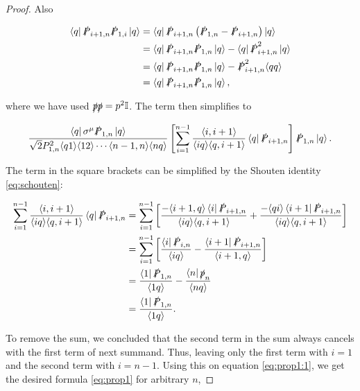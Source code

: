 \documentclass{article}
\theoremstyle{definition}
\numberwithin{equation}{section}
\begin{document}
\begin{proof}
    Also

    \begin{align*}
        \bra{q} \slashed{P}_{i+1,n} \slashed{P}_{1,i} \ket{q} &= \bra{q} \slashed{P}_{i+1,n} \left( \slashed{P}_{1,n} - \slashed{P}_{i+1,n} \right) \ket{q} \\
        &= \bra{q} \slashed{P}_{i+1,n} \slashed{P}_{1,n} \ket{q} - \bra{q} \slashed{P}_{i+1,n}^2 \ket{q} \\
        &= \bra{q} \slashed{P}_{i+1,n} \slashed{P}_{1,n} \ket{q} - \slashed{P}_{i+1,n}^2 \langle qq \rangle \\
        &= \bra{q} \slashed{P}_{i+1,n} \slashed{P}_{1,n} \ket{q},
    \end{align*}

    where we have used $\slashed{p}\slashed{p} = p^2\mathbb{I}$. The term then simplifies to

    \begin{align}
        \frac{ \bra{q} \sigma^{\mu} \slashed{P}_{1,n} \ket{q} }{ \sqrt{2} P_{1,n}^2 \langle q1 \rangle \langle 12 \rangle \cdots \langle n-1,n \rangle \langle nq \rangle } \left[ \sum_{i=1}^{n-1} \frac{ \langle i,i+1 \rangle }{\langle iq \rangle \langle q,i+1 \rangle} \bra{q} \slashed{P}_{i+1,n} \right] \slashed{P}_{1,n} \ket{q}. \label{eq:prop1:1}
    \end{align}

    The term in the square brackets can be simplified by the Shouten identity \eqref{eq:schouten}:

    \begin{align}
        \sum_{i=1}^{n-1} \frac{ \langle i,i+1 \rangle }{\langle iq \rangle \langle q,i+1 \rangle} \bra{q} \slashed{P}_{i+1,n} &= \sum_{i=1}^{n-1} \left[ \frac{- \langle i+1,q \rangle \bra{i} \slashed{P}_{i+1,n} }{\langle iq \rangle \langle q,i+1 \rangle} + \frac{- \langle qi \rangle \bra{i+1} \slashed{P}_{i+1,n}}{\langle iq \rangle \langle q,i+1 \rangle} \right] \\
        &= \sum_{i=1}^{n-1} \left[ \frac{\bra{i} \slashed{P}_{i,n} }{\langle iq \rangle} - \frac{\bra{i+1} \slashed{P}_{i+1,n}}{\langle i+1,q \rangle} \right] \\
        &= \frac{\bra{1} \slashed{P}_{1,n} }{\langle 1q \rangle} - \frac{\bra{n} \slashed{p}_{n} }{\langle nq \rangle} \\
        &= \frac{\bra{1} \slashed{P}_{1,n} }{\langle 1q \rangle} \label{eq:helper}.
    \end{align}

    To remove the sum, we concluded that the second term in the sum always cancels with the first term of next summand. Thus, leaving only the first term with $i=1$ and the second term with $i=n-1$. Using this on equation \eqref{eq:prop1:1}, we get the desired formula \eqref{eq:prop1} for arbitrary $n$,


\end{proof}
\end{document}
